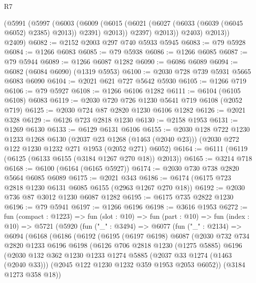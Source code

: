\begin{lexlean}{R7}
\begin{coremodule}
            (@5991
              (@5997
                (@6003
                  (@6009
                    (@6015 (@6021 (@6027 (@6033 (@6039 (@6045 @6052) @2385) @2013)) @2391) @2013))
                  @2397)
                @2013))
            @2403)
          @2013))
      @2409)
@6082 := @2152 @2003 @297 @740 @5933 @5945
@6083 := @79 @5928
@6084 := @1266 @6083
@6085 := @79 @5938
@6086 := @1266 @6085
@6087 := @79 @5944
@6089 := @1266 @6087 @1282
@6090 := @6086 @6089
@6094 := @6082 (@6084 @6090) (@1319 @5953)
@6100 := @2030 @728 @739 @5931 @5665 @6083 @6090
@6104 := @2021 @621 @727 @5642 @5930
@6105 := @1266 @719
@6106 := @79 @5927
@6108 := @1266 @6106 @1282
@6111 := @6104 (@6105 @6108) @6083
@6119 := @2030 @720 @726 @1230 @5641 @719 @6108 (@2052 @719)
@6125 := @2030 @724 @87 @2820 @1230 @6106 @1282
@6126 := @2021 @328
@6129 := @6126 @723 @2818 @1230
@6130 := @2158 @1953
@6131 := @1269 @6130
@6133 := @6129 @6131 @6106
@6155 := @2030
    @128
    @722
    @1230
    @1233
    @1268
    @6130
    (@2037 @23 @1268 (@1463 (@2040 @23)))
    (@2030 @272 @122 @1230 @1232 @271 @1953 (@2052 @271) @6052)
@6164 := @6111 (@6119 (@6125 (@6133 @6155 (@3184 @1267 @270 @18)) @2013))
@6165 := @3214 @718
@6168 := @6100 (@6164 (@6165 @5927))
@6174 := @2030 @730 @738 @2820 @5664 @6085 @6089
@6175 := @2021 @343
@6186 := @6174 (@6175 @723 @2818 @1230 @6131 @6085 @6155 (@2963 @1267 @270 @18))
@6192 := @2030 @736 @87 @3012 @1230 @6087 @1282
@6195 := @6175 @735 @2822 @1230
@6196 := @79 @5941
@6197 := @1266 @6196
@6198 := @3616 @1953
@6272 := fun (compact : @1223) =>
  fun (slot : @10) =>
  fun (part : @10) =>
  fun (index : @10) =>
  @5721
    (@5920
      (fun ("_" : @3494) =>
      @6077
        (fun ("_" : @2134) =>
        @6094
          (@6168
            (@6186
              (@6192
                (@6195
                  (@6197 @6198)
                  @6087
                  (@2030
                    @732
                    @734
                    @2820
                    @1233
                    @6196
                    @6198
                    (@6126
                      @706
                      @2818
                      @1230
                      (@1275 @5885)
                      @6196
                      (@2030
                        @132
                        @362
                        @1230
                        @1233
                        @1274
                        @5885
                        (@2037 @33 @1274 (@1463 (@2040 @33)))
                        (@2045 @122 @1230 @1232 @359 @1953 @2053 @6052))
                      (@3184 @1273 @358 @18))

\end{coremodule}
\end{lexlean}
